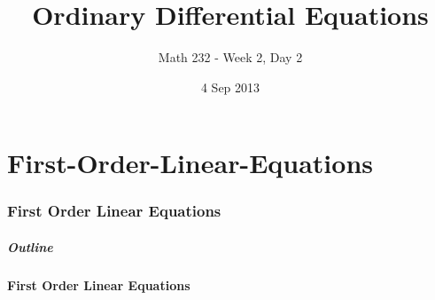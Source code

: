 \part{First-Order-Linear-Equations}
\section{First Order Linear Equations}

\title{Ordinary Differential Equations}
\subtitle{Math 232 - Week 2, Day 2}
\date{4 Sep 2013}

\begin{frame}
  \titlepage
\end{frame}

\begin{frame}
  \frametitle{Outline}
  \tableofcontents[ currentsection ]
\end{frame}


\subsection{First Order Linear Equations}


